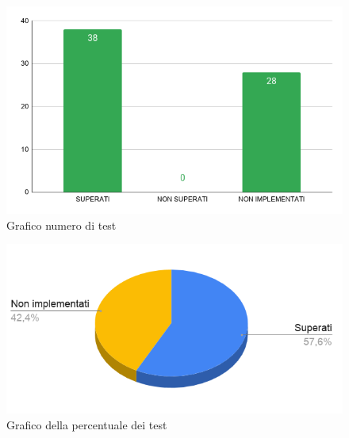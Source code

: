     \begin{figure}[H]
        \centering
        \includegraphics[width=10 cm]{source/sections/images/num-test.png}
        \caption{Grafico numero di test}
    \end{figure}

    \begin{figure}[H]
        \centering
        \includegraphics[width=10 cm]{source/sections/images/torta-test.png}
        \caption{Grafico della percentuale dei test}
    \end{figure}